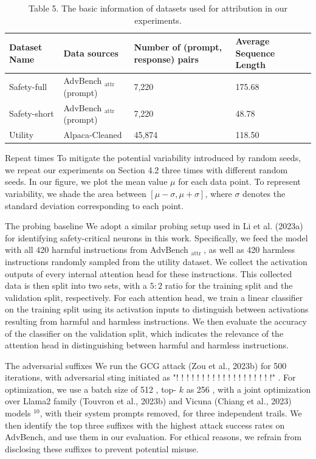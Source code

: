 \documentclass[10pt]{article}
\begin{document}
\begin{table}[h]
\begin{center}
\begin{tabular}{|l|l|l|l|}
\hline
Dataset Name & Data sources & Number of (prompt, response) pairs & Average Sequence Length \\
\hline
Safety-full & AdvBench ${ }_{\text {attr }}$ (prompt) & 7,220 & 175.68 \\
\hline
Safety-short & AdvBench ${ }_{\text {attr }}$ (prompt) & 7,220 & 48.78 \\
\hline
Utility & Alpaca-Cleaned & 45,874 & 118.50 \\
\hline
\end{tabular}
\captionsetup{labelformat=empty}
\caption{Table 5. The basic information of datasets used for attribution in our experiments.}
\end{center}
\end{table}

Repeat times To mitigate the potential variability introduced by random seeds, we repeat our experiments on Section 4.2 three times with different random seeds. In our figure, we plot the mean value $\mu$ for each data point. To represent variability, we shade the area between $[\mu-\sigma, \mu+\sigma]$, where $\sigma$ denotes the standard deviation corresponding to each point.

The probing baseline We adopt a similar probing setup used in Li et al. (2023a) for identifying safety-critical neurons in this work. Specifically, we feed the model with all 420 harmful instructions from AdvBench ${ }_{\text {attr }}$, as well as 420 harmless instructions randomly sampled from the utility dataset. We collect the activation outputs of every internal attention head for these instructions. This collected data is then split into two sets, with a $5: 2$ ratio for the training split and the validation split, respectively. For each attention head, we train a linear classifier on the training split using its activation inputs to distinguish between activations resulting from harmful and harmless instructions. We then evaluate the accuracy of the classifier on the validation split, which indicates the relevance of the attention head in distinguishing between harmful and harmless instructions.

The adversarial suffixes We run the GCG attack (Zou et al., 2023b) for 500 iterations, with adversarial sting initiated as "! ! ! ! ! ! ! ! ! ! ! ! ! ! ! ! ! ! !" . For optimization, we use a batch size of 512 , top- $k$ as 256 , with a joint optimization over Llama2 family (Touvron et al., 2023b) and Vicuna (Chiang et al., 2023) models ${ }^{10}$, with their system prompts removed, for three independent trails. We then identify the top three suffixes with the highest attack success rates on AdvBench, and use them in our evaluation. For ethical reasons, we refrain from disclosing these suffixes to prevent potential misuse.
\end{document}
